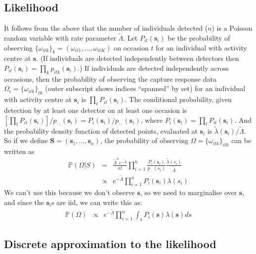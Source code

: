 \documentclass[a4paper]{article}
\begin{document}
\subsection{Likelihood}

It follows from the above that the number of individuals detected ($n$) is a Poisson random variable with rate parameter $\tilde{\Lambda}$. Let $P_{it}(\boldsymbol{s}_i)$  be the probability of observing $\{\omega_{itk}\}_k=(\omega_{it1},\ldots,\omega_{itK})$ on occasion $t$ for an individual with activity centre at $\boldsymbol{s}$. (If individuals are detected independently between detectors then $P_{it}(\boldsymbol{s}_i)=\prod_kp_{itk}(\boldsymbol{s}_i)$.) If individuals are detected independently across occasions, then the probability of observing the capture response data $\Omega_i=\{\omega_{itk}\}_{tk}$ (outer subscript shows indices ``spanned'' by set) for an individual with activity centre at $\boldsymbol{s}_i$ is $\prod_tP_{it}(\boldsymbol{s}_i)$. The conditional probability, given detection by at least one detector on at least one occasion is $[\prod_tP_{it}(\boldsymbol{s}_i)]/p_{\cdot\cdot}(\boldsymbol{s}_i)=P_i(\boldsymbol{s}_i)/p_{\cdot\cdot}(\boldsymbol{s}_i)$, where $P_i(\boldsymbol{s}_i)=\prod_tP_{it}(\boldsymbol{s}_i)$. And the probability density function of detected points, evaluated at $\boldsymbol{s}_i$ is $\tilde{\lambda}(\boldsymbol{s}_i)/\tilde{\Lambda}$. So if we define $\boldsymbol{S}=(\boldsymbol{s}_1,\ldots,\boldsymbol{s}_n)$, the probability of observing $\Omega=\{\omega_{itk}\}_{itk}$ can be written as
\begin{eqnarray}
\mathbb{P}(\Omega|S)&=&
\frac{\tilde{\Lambda}^ne^{-\tilde{\Lambda}}}{n!}\prod_{i=1}^n\frac{P_i(\boldsymbol{s}_i)}{p_{\cdot\cdot}(s_i)}\frac{\tilde{\lambda}(s_i)}{\tilde{\Lambda}}
\nonumber \\
&\propto&e^{-\tilde{\Lambda}}\prod_{i=1}^nP_i(\boldsymbol{s}_i)\lambda(s_i)
\end{eqnarray}
\noindent
We can't use this because we don't observe $\boldsymbol{s}$, so we need to marginalise over $\boldsymbol{s}$, and since the $\boldsymbol{s}_i$s are iid, we can write this as:
\begin{eqnarray}
\mathbb{P}(\Omega)
&\propto&e^{-\tilde{\Lambda}}\prod_{i=1}^n\int_{s}P_i(\boldsymbol{s})\lambda(\boldsymbol{s})ds
\end{eqnarray}

\subsection{Discrete approximation to the likelihood}
\end{document}
